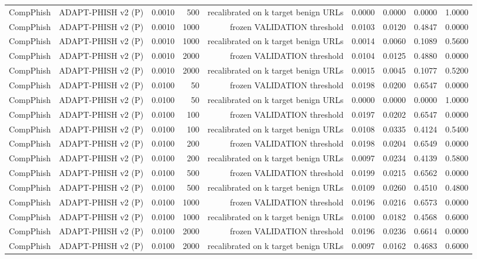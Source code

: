 \begin{table}[t]
\begin{tabular}{llrrrrrrr}
CompPhish & ADAPT-PHISH v2 (P) & 0.0010 & 500 & recalibrated on k target benign URLs & 0.0000 & 0.0000 & 0.0000 & 1.0000 \\
CompPhish & ADAPT-PHISH v2 (P) & 0.0010 & 1000 & frozen VALIDATION threshold & 0.0103 & 0.0120 & 0.4847 & 0.0000 \\
CompPhish & ADAPT-PHISH v2 (P) & 0.0010 & 1000 & recalibrated on k target benign URLs & 0.0014 & 0.0060 & 0.1089 & 0.5600 \\
CompPhish & ADAPT-PHISH v2 (P) & 0.0010 & 2000 & frozen VALIDATION threshold & 0.0104 & 0.0125 & 0.4880 & 0.0000 \\
CompPhish & ADAPT-PHISH v2 (P) & 0.0010 & 2000 & recalibrated on k target benign URLs & 0.0015 & 0.0045 & 0.1077 & 0.5200 \\
CompPhish & ADAPT-PHISH v2 (P) & 0.0100 & 50 & frozen VALIDATION threshold & 0.0198 & 0.0200 & 0.6547 & 0.0000 \\
CompPhish & ADAPT-PHISH v2 (P) & 0.0100 & 50 & recalibrated on k target benign URLs & 0.0000 & 0.0000 & 0.0000 & 1.0000 \\
CompPhish & ADAPT-PHISH v2 (P) & 0.0100 & 100 & frozen VALIDATION threshold & 0.0197 & 0.0202 & 0.6547 & 0.0000 \\
CompPhish & ADAPT-PHISH v2 (P) & 0.0100 & 100 & recalibrated on k target benign URLs & 0.0108 & 0.0335 & 0.4124 & 0.5400 \\
CompPhish & ADAPT-PHISH v2 (P) & 0.0100 & 200 & frozen VALIDATION threshold & 0.0198 & 0.0204 & 0.6549 & 0.0000 \\
CompPhish & ADAPT-PHISH v2 (P) & 0.0100 & 200 & recalibrated on k target benign URLs & 0.0097 & 0.0234 & 0.4139 & 0.5800 \\
CompPhish & ADAPT-PHISH v2 (P) & 0.0100 & 500 & frozen VALIDATION threshold & 0.0199 & 0.0215 & 0.6562 & 0.0000 \\
CompPhish & ADAPT-PHISH v2 (P) & 0.0100 & 500 & recalibrated on k target benign URLs & 0.0109 & 0.0260 & 0.4510 & 0.4800 \\
CompPhish & ADAPT-PHISH v2 (P) & 0.0100 & 1000 & frozen VALIDATION threshold & 0.0196 & 0.0216 & 0.6573 & 0.0000 \\
CompPhish & ADAPT-PHISH v2 (P) & 0.0100 & 1000 & recalibrated on k target benign URLs & 0.0100 & 0.0182 & 0.4568 & 0.6000 \\
CompPhish & ADAPT-PHISH v2 (P) & 0.0100 & 2000 & frozen VALIDATION threshold & 0.0196 & 0.0236 & 0.6614 & 0.0000 \\
CompPhish & ADAPT-PHISH v2 (P) & 0.0100 & 2000 & recalibrated on k target benign URLs & 0.0097 & 0.0162 & 0.4683 & 0.6000 \\

\end{tabular}
\end{table}
